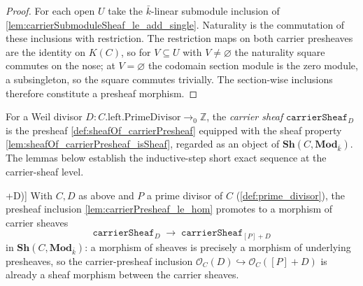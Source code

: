\begin{proof}
  For each open \(U\) take the \(\bar k\)-linear submodule inclusion of
  \cref{lem:carrierSubmoduleSheaf_le_add_single}. Naturality is the
  commutation of these inclusions with restriction. The restriction maps on
  both carrier presheaves are the identity on \(K(C)\), so for
  \(V \subseteq U\) with \(V \neq \varnothing\) the naturality square
  commutes on the nose; at \(V = \varnothing\) the codomain section module is
  the zero module, a subsingleton, so the square commutes trivially. The
  section-wise inclusions therefore constitute a presheaf morphism.
\end{proof}

\begin{definition}

  \label{def:sheafOf_carrierSheaf}
  For a Weil divisor \(D : C.\text{left.PrimeDivisor} \to_0 \mathbb Z\), the
  \emph{carrier sheaf} \(\texttt{carrierSheaf}_D\) is the presheaf
  \cref{def:sheafOf_carrierPresheaf} equipped with the sheaf property
  \cref{lem:sheafOf_carrierPresheaf_isSheaf}, regarded as an object of
  \(\mathbf{Sh}(C, \mathbf{Mod}_{\bar k})\). The lemmas below establish
  the inductive-step short exact sequence at the carrier-sheaf level.
\end{definition}

\begin{definition}

\leanok
[Sheaf-level inclusion \(\mathcal O_C(D) \hookrightarrow \mathcal O_C([P]+D)\)]
  \label{def:sheafOf_carrierSheafHom_le_add_single}
  With \(C, D\) as above and \(P\) a prime divisor of \(C\)
  (\cref{def:prime_divisor}), the presheaf inclusion
  \cref{lem:carrierPresheaf_le_hom} promotes to a morphism of carrier sheaves
  \[
    \texttt{carrierSheaf}_D \;\longrightarrow\;
    \texttt{carrierSheaf}_{[P]+D}
  \]
  in \(\mathbf{Sh}(C, \mathbf{Mod}_{\bar k})\): a morphism of sheaves is
  precisely a morphism of underlying presheaves, so the carrier-presheaf
  inclusion \(\mathcal O_C(D) \hookrightarrow \mathcal O_C([P]+D)\) is already a
  sheaf morphism between the carrier sheaves.
\end{definition}

